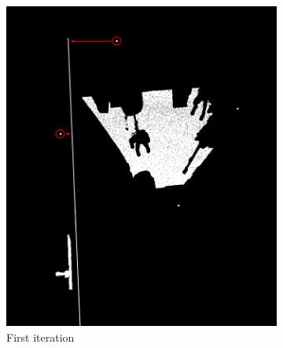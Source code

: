 			\begin{figure}[p] 
				\centering
				\begin{subfigure}[b]{0.49\linewidth}
					\centering
					\includegraphics[width=1\linewidth]{"Includes/images/Project Points/F-1"} 
					\caption{First iteration} 
					\label{fig4Adjust:a} 
					\vspace{4ex}
				\end{subfigure}
				\begin{subfigure}[b]{0.49\linewidth}
					\centering

\end{subfigure}
\end{figure}
